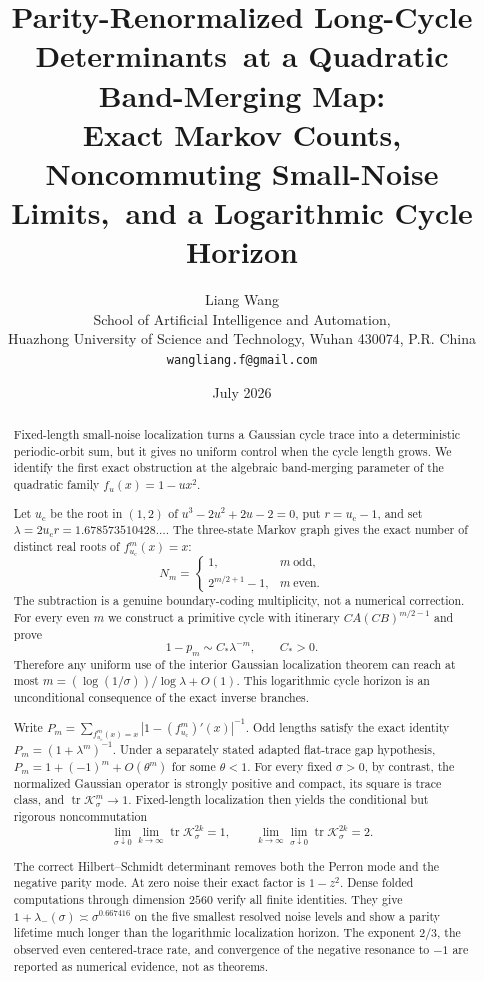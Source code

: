 \documentclass[11pt]{article}
\title{\textbf{Parity-Renormalized Long-Cycle Determinants}\
\textbf{at a Quadratic Band-Merging Map:}\\
\large Exact Markov Counts, Noncommuting Small-Noise Limits,\
and a Logarithmic Cycle Horizon}
\author{Liang Wang\\
\small School of Artificial Intelligence and Automation,\\[-0.2em]
\small Huazhong University of Science and Technology, Wuhan 430074, P.R. China\\
\small \texttt{wangliang.f@gmail.com}}
\date{July 2026}
\theoremstyle{definition}
\theoremstyle{remark}
\newcommand{\uc}{u_{\mathrm c}}
\newcommand{\cK}{\mathcal K}
\newcommand{\tr}{\operatorname{tr}}
\begin{document}
\maketitle

\begin{abstract}
Fixed-length small-noise localization turns a Gaussian cycle trace into a
deterministic periodic-orbit sum, but it gives no uniform control when the
cycle length grows.  We identify the first exact obstruction at the algebraic
band-merging parameter of the quadratic family $f_u(x)=1-u x^2$.

Let $\uc$ be the root in $(1,2)$ of
$u^3-2u^2+2u-2=0$, put $r=\uc-1$, and set
$\lambda=2\uc r=1.678573510428\ldots$.  The three-state Markov graph gives the
exact number of distinct real roots of $f_{\uc}^m(x)=x$:
\[
 N_m=\begin{cases}
 1,&m\ \text{odd},\\
 2^{m/2+1}-1,&m\ \text{even}.
 \end{cases}
\]
The subtraction is a genuine boundary-coding multiplicity, not a numerical
correction.  For every even $m$ we construct a primitive cycle with itinerary
$CA(CB)^{m/2-1}$ and prove
\[
 1-p_m\sim C_*\lambda^{-m},\qquad C_*>0.
\]
Therefore any uniform use of the interior Gaussian localization theorem can
reach at most
$m=(\log(1/\sigma))/\log\lambda+O(1)$.  This logarithmic cycle horizon is an
unconditional consequence of the exact inverse branches.

Write
$P_m=\sum_{f_{\uc}^m(x)=x}|1-(f_{\uc}^m)'(x)|^{-1}$.  Odd lengths satisfy the
exact identity $P_m=(1+\lambda^m)^{-1}$.  Under a separately stated adapted
flat-trace gap hypothesis, $P_m=1+(-1)^m+O(\theta^m)$ for some $\theta<1$.
For every fixed $\sigma>0$, by contrast, the normalized Gaussian operator is
strongly positive and compact, its square is trace class, and
$\tr\cK_\sigma^m\to1$.  Fixed-length localization then yields the conditional
but rigorous noncommutation
\[
 \lim_{\sigma\downarrow0}\lim_{k\to\infty}\tr\cK_\sigma^{2k}=1,
 \qquad
 \lim_{k\to\infty}\lim_{\sigma\downarrow0}\tr\cK_\sigma^{2k}=2.
\]

The correct Hilbert--Schmidt determinant removes both the Perron mode and the
negative parity mode.  At zero noise their exact factor is $1-z^2$.
Dense folded computations through dimension $2560$ verify all finite
identities.  They give
$1+\lambda_-(\sigma)\asymp\sigma^{0.667416}$ on the five smallest resolved
noise levels and show a parity lifetime much longer than the logarithmic
localization horizon.  The exponent $2/3$, the observed even centered-trace
rate, and convergence of the negative resonance to $-1$ are reported as
numerical evidence, not as theorems.
\end{abstract}
\end{document}
